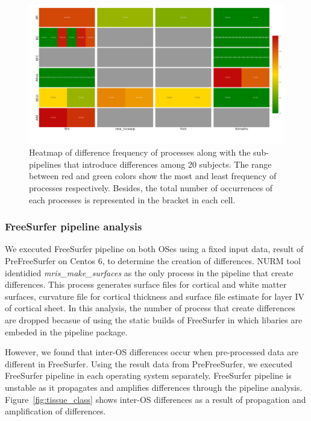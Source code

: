 \documentclass[a4paper,num-refs]{oup-contemporary}
\begin{document}
{\begin{figure}
\centering
  \includegraphics[width=\columnwidth]{images/pfs_heatmap.png}
  \caption{Heatmap of difference frequency of processes along with the sub-pipelines that introduce 
           differences among 20 subjects. The range between red and green colors show the most and 
           least frequency of processes respectively. Besides, the total number 
           of occurrences of each processes is represented in the bracket in each cell.}
  \label{fig:pfs_freq}
\end{figure}


\subsubsection{FreeSurfer pipeline analysis} 

We executed FreeSurfer pipeline on both OSes using a fixed input data, result of PreFreeSurfer on Centos 6, 
to determine the creation of differences. 
NURM tool identidied \emph{mris\_make\_surfaces} as the only process in the pipeline that create differences.
This process generates surface files for cortical and white matter surfaces, curvature file for cortical thickness and 
surface file estimate for layer IV of cortical sheet. 
In this analysis, the number of process that create differences are dropped becasue of 
using the static builds of FreeSurfer in which libaries are embeded in the pipeline package.

However, we found that inter-OS differences occur when pre-processed data are different in FreeSurfer. 
Using the result data from PreFreeSurfer, we executed FreeSurfer pipeline in each operating system separately.
FreeSurfer pipeline is unstable as it propagates and amplifies differences 
through the pipeline analysis.
Figure~\ref{fig:tissue_class} shows inter-OS differences  
as a result of propagation and amplification of differences. %


}
\end{document}
